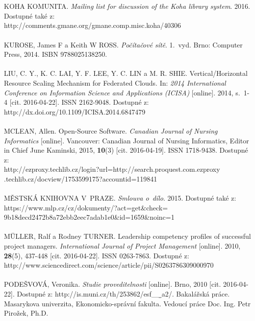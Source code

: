 \documentclass[
	11pt, oneside, printed, final, palatino, monochrome
	microtype,
	table,   %
	lof,     %
	lot     %
]{fithesis3}
\begin{document}
{~\\ ~\\ \noindent
[20] KOHA KOMUNITA. \textit{Mailing list for discussion of the Koha library system}. 2016. Dostupné také z: \\http://comments.gmane.org/gmane.comp.misc.koha/40306
~\\ ~\\ \noindent
[21] KUROSE, James F a Keith W ROSS. \textit{Počítačové sítě}. 1.~vyd. Brno: Computer Press, 2014. ISBN 9788025138250.
~\\ ~\\ \noindent
[22] LIU, C. Y., K. C. LAI, Y. F. LEE, Y. C. LIN a M. R. SHIE. Vertical/Horizontal Resource Scaling Mechanism for Federated Clouds. In: \textit{2014 International Conference on Information Science and Applications (ICISA)} [online]. 2014, s.~1-4 [cit. 2016-04-22]. ISSN 2162-9048. Dostupné z: \\http://dx.doi.org/10.1109/ICISA.2014.6847479
~\\ ~\\ \noindent
[23] MCLEAN, Allen. Open-Source Software. \textit{Canadian Journal of Nursing Informatics} [online]. Vancouver: Canadian Journal of Nursing Informatics, Editor in Chief June Kaminski, 2015, \textbf{10}(3) [cit. 2016-04-19]. ISSN 1718-9438. Dostupné z:\\ http://ezproxy.techlib.cz/login?url=http://search.proquest.com.ezproxy\\.techlib.cz/docview/1753599175?accountid=119841
~\\ ~\\ \noindent
[24] MĚSTSKÁ KNIHOVNA V~PRAZE. \textit{Smlouva o~dílo}. 2015. Dostupné také z:\\ https://www.mlp.cz/cz/dokumenty/?act=get\&check=\\9b18decd2472b8a72ebb2eec7adab1e0\&id=1659\&noinc=1
~\\ ~\\ \noindent
[25] MÜLLER, Ralf a Rodney TURNER. Leadership competency profiles of successful project managers. \textit{International Journal of Project Management} [online]. 2010, 	\textbf{28}(5), 437-448 [cit. 2016-04-22]. ISSN 0263-7863. Dostupné z: http://www.sciencedirect.com/science/article/pii/S0263786309000970
~\\ ~\\ \noindent
[26] PODEŠVOVÁ, Veronika. \textit{Studie proveditelnosti} [online]. Brno, 2010 [cit. 2016-04-22]. Dostupné z: http://is.muni.cz/th/253862/esf\_\b\_a2/. Bakalářská práce. Masarykova univerzita, Ekonomicko-správní fakulta. Vedoucí práce Doc. Ing. Petr Pirožek, Ph.D.
}
\end{document}
